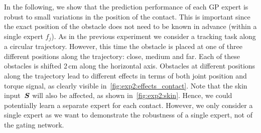 	
	In the following, we show that the prediction performance of each GP expert is robust to small variations in the position of the contact.
	This is important since the exact position of the obstacle does not need to be known in advance (within a single expert $f_j$).
	As in the previous experiment we consider a tracking task along a circular trajectory.
	However, this time the obstacle is placed at one of three different positions along the trajectory: close, medium and far.
    Each of these obstacles is shifted 2\,cm along the horizontal axis.
	Obstacles at different positions along the trajectory lead to different effects in terms of both joint position and torque signal, as clearly visible in~\fig\ref{fig:exp2:effects_contact}.
	Note that the skin input~$\mathcal{\boldsymbol S}$ will also be affected, as shown in~\fig\ref{fig:exp2:skin}. 
    Hence, we could potentially learn a separate expert for each contact. 
    However, we only consider a single expert as we want to demonstrate the robustness of a single expert, not of the gating network.
    
